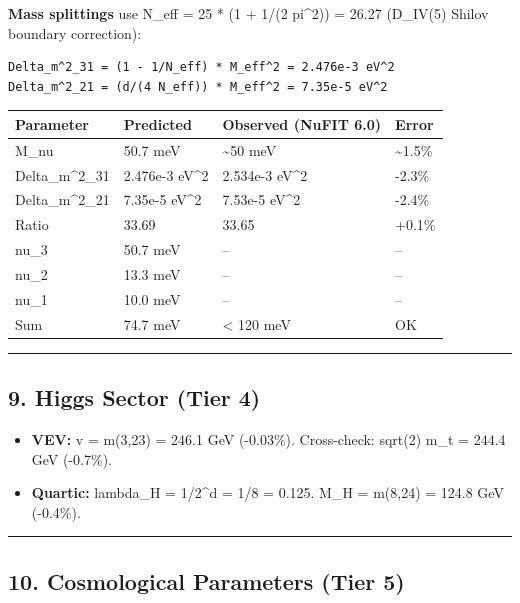 \documentclass[
]{article}
\newcounter{none} %
\providecommand{\tightlist}{%
  \setlength{\itemsep}{0pt}\setlength{\parskip}{0pt}}
\begin{document}
\textbf{Mass splittings} use N\_eff = 25 * (1 + 1/(2 pi\^{}2)) = 26.27
(D\_IV(5) Shilov boundary correction):

\begin{verbatim}
Delta_m^2_31 = (1 - 1/N_eff) * M_eff^2 = 2.476e-3 eV^2
Delta_m^2_21 = (d/(4 N_eff)) * M_eff^2 = 7.35e-5 eV^2
\end{verbatim}

{\def\LTcaptype{none} %
\begin{longtable}[]{@{}llll@{}}
\toprule\noalign{}
Parameter & Predicted & Observed (NuFIT 6.0) & Error \\
\midrule\noalign{}
\endhead
\bottomrule\noalign{}
\endlastfoot
M\_nu & 50.7 meV & \textasciitilde50 meV & \textasciitilde1.5\% \\
Delta\_m\^{}2\_31 & 2.476e-3 eV\^{}2 & 2.534e-3 eV\^{}2 & -2.3\% \\
Delta\_m\^{}2\_21 & 7.35e-5 eV\^{}2 & 7.53e-5 eV\^{}2 & -2.4\% \\
Ratio & 33.69 & 33.65 & +0.1\% \\
nu\_3 & 50.7 meV & -- & -- \\
nu\_2 & 13.3 meV & -- & -- \\
nu\_1 & 10.0 meV & -- & -- \\
Sum & 74.7 meV & \textless{} 120 meV & OK \\
\end{longtable}
}

\begin{center}\rule{0.5\linewidth}{0.5pt}\end{center}

\subsection{9. Higgs Sector (Tier 4)}\label{higgs-sector-tier-4}

\begin{itemize}
\tightlist
\item
  \textbf{VEV:} v = m(3,23) = 246.1 GeV (-0.03\%). Cross-check: sqrt(2)
  m\_t = 244.4 GeV (-0.7\%).
\item
  \textbf{Quartic:} lambda\_H = 1/2\^{}d = 1/8 = 0.125. M\_H = m(8,24) =
  124.8 GeV (-0.4\%).
\end{itemize}

\begin{center}\rule{0.5\linewidth}{0.5pt}\end{center}

\subsection{10. Cosmological Parameters (Tier
5)}\label{cosmological-parameters-tier-5}
\end{document}
